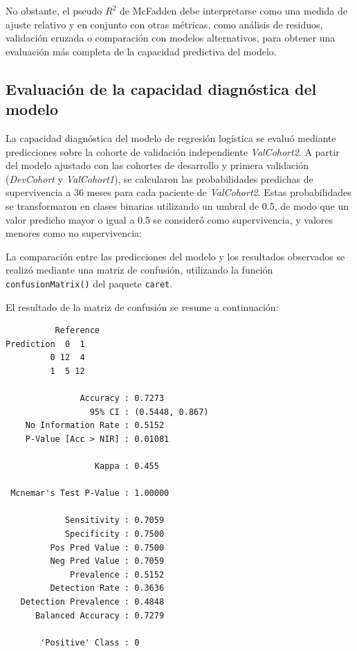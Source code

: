 \documentclass[12pt]{article} %
\begin{document}
No obstante, el pseudo $R^2$ de McFadden debe interpretarse como una medida de ajuste relativo y en conjunto con otras métricas, como análisis de residuos, validación cruzada o comparación con modelos alternativos, para obtener una evaluación más completa de la capacidad predictiva del modelo.

\subsection{Evaluación de la capacidad diagnóstica del modelo}

La capacidad diagnóstica del modelo de regresión logística se evaluó mediante predicciones sobre la cohorte de validación independiente \textit{ValCohort2}. A partir del modelo ajustado con las cohortes de desarrollo y primera validación (\textit{DevCohort} y \textit{ValCohort1}), se calcularon las probabilidades predichas de supervivencia a 36 meses para cada paciente de \textit{ValCohort2}. Estas probabilidades se transformaron en clases binarias utilizando un umbral de 0.5, de modo que un valor predicho mayor o igual a 0.5 se consideró como supervivencia, y valores menores como no supervivencia:

La comparación entre las predicciones del modelo y los resultados observados se realizó mediante una matriz de confusión, utilizando la función \texttt{confusionMatrix()} del paquete \texttt{caret}. 

El resultado de la matriz de confusión se resume a continuación:

\begin{verbatim}
          Reference
Prediction  0  1
         0 12  4
         1  5 12
                                          
               Accuracy : 0.7273         
                 95% CI : (0.5448, 0.867)
    No Information Rate : 0.5152         
    P-Value [Acc > NIR] : 0.01081        
                                          
                  Kappa : 0.455          
                                          
 Mcnemar's Test P-Value : 1.00000        
                                          
            Sensitivity : 0.7059         
            Specificity : 0.7500         
         Pos Pred Value : 0.7500         
         Neg Pred Value : 0.7059         
             Prevalence : 0.5152         
         Detection Rate : 0.3636         
   Detection Prevalence : 0.4848         
      Balanced Accuracy : 0.7279         
                                          
       'Positive' Class : 0
\end{verbatim}
\end{document}
